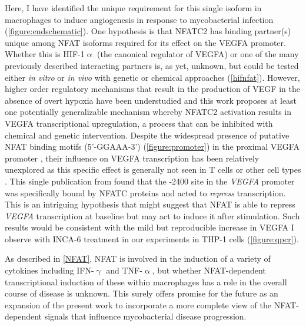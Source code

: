 Here, I have identified the unique requirement for this single isoform in macrophages to induce angiogenesis in response to mycobacterial infection (\autoref{figure:endschematic}). One hypothesis is that NFATC2 has binding partner(s) unique among NFAT isoforms required for its effect on the VEGFA promoter. Whether this is HIF\hyp{}1$\upalpha$ (the canonical regulator of VEGFA) or one of the many previously described interacting partners is, as yet, unknown, but could be tested either \textit{in vitro} or \textit{in vivo} with genetic or chemical approaches (\autoref{hifnfat}). However, higher order regulatory mechanisms that result in the production of VEGF in the absence of overt hypoxia have been understudied and this work proposes at least one potentially generalizable mechanism whereby NFATC2 activation results in VEGFA transcriptional upregulation, a process that can be inhibited with chemical and genetic intervention. Despite the widespread presence of putative NFAT binding motifs (5'\hyp{}GGAAA\hyp{}3') (\autoref{figure:promoter}) in the proximal VEGFA promoter \citep{Gearing2019}, their influence on VEGFA transcription has been relatively unexplored as this specific effect is generally not seen in T cells or other cell types \citep{Chang2004}. This single publication from \citet{Chang2004} found that the \hyp{}2400 site in the \textit{VEGFA} promoter was specifically bound by NFATC proteins and acted to \textit{repress} transcription. This is an intriguing hypothesis that might suggest that NFAT is able to repress \textit{VEGFA} transcription at baseline but may act to induce it after stimulation. Such results would be consistent with the mild but reproducible increase in VEGFA I observe with INCA\hyp{}6 treatment in our experiments in THP\hyp{}1 cells (\autoref{figure:qpcr}). 

As described in \autoref{NFAT}, NFAT is involved in the induction of a variety of cytokines including IFN\hyp{}$\upgamma$ and TNF\hyp{}$\upalpha$, but whether NFAT\hyp{}dependent transcriptional induction of these within macrophages has a role in the overall course of disease is unknown. This surely offers promise for the future as an expansion of the present work to incorporate a more complete view of the NFAT\hyp{}dependent signals that influence mycobacterial disease progression.

